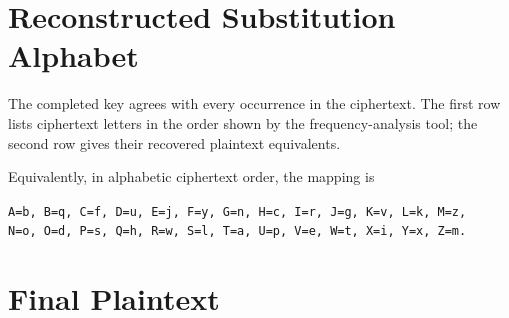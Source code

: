 \documentclass[12pt,a4paper]{article}
\begin{document}
\newpage
\section{Reconstructed Substitution Alphabet}

The completed key agrees with every occurrence in the ciphertext. The first row lists ciphertext letters in the order shown by the frequency-analysis tool; the second row gives their recovered plaintext equivalents.

\begin{table}[H]
\centering
\setlength{\tabcolsep}{3.2pt}
\renewcommand{\arraystretch}{1.25}
\caption{Recovered substitution key for Variant 17}
\end{table}

Equivalently, in alphabetic ciphertext order, the mapping is

\begin{center}
\texttt{A=b, B=q, C=f, D=u, E=j, F=y, G=n, H=c, I=r, J=g, K=v, L=k, M=z,}\\
\texttt{N=o, O=d, P=s, Q=h, R=w, S=l, T=a, U=p, V=e, W=t, X=i, Y=x, Z=m.}
\end{center}

\section{Final Plaintext}
\end{document}
